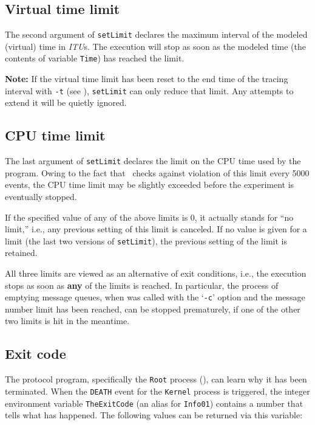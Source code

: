 \subsection{Virtual time limit}
\label{rm_ts_st}

The second argument of {\tt setLimit} declares the maximum interval of
the modeled (virtual) time in {\em ITU\/}s.
The execution will stop as soon as the modeled time (the contents of
variable {\tt Time}) has reached the limit.

\noindent
{\bf Note:}
If the virtual time limit has been reset
to the end time of the tracing interval with {\tt -t} (see ),
{\tt setLimit} can only reduce that limit.
Any attempts to extend it will be quietly ignored.

\subsection{CPU time limit}
\label{rm_ts_cp}

The last argument of {\tt setLimit} declares the limit on the CPU time used
by the program.
Owing to the fact that \smurph\ checks against violation of this limit
every 5000 events, the CPU time limit
may be slightly exceeded before the experiment is eventually stopped.

\medskip

If the specified value of any of the above limits is 0, it actually stands
for ``no limit,'' i.e., any previous setting of this limit is canceled.
If no value is given for a limit (the last two versions of {\tt setLimit}),
the previous setting of the limit is retained.

All three limits are viewed as an alternative of exit conditions, i.e.,
the execution stops as soon as {\bf any} of the limits is
reached.
In particular, the process of emptying message queues, when {\smurph}
was called with the `{\tt -c}' option and the message number limit has been
reached, can be stopped prematurely, if one of the other two limits
is hit in the meantime.

\subsection{Exit code}
\label{rm_ts_ec}

The protocol program, specifically the {\tt Root} process (),
can learn why it has been terminated.
When the {\tt DEATH} event for the {\tt Kernel} process is triggered,
the integer environment variable {\tt TheExitCode} (an alias for {\tt Info01})
contains a number that tells what has happened.
The following values can be returned via this variable:

